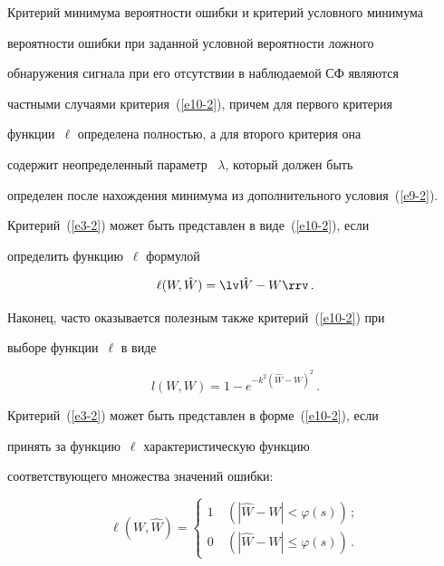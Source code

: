Критерий минимума вероятности ошибки и критерий условного минимума


вероятности ошибки при заданной условной вероятности ложного


обнаружения сигнала при его отсутствии в наблюдаемой СФ являются


частными случаями критерия~(\ref{e10-2}), причем для первого критерия


функции~$\ell$ определена полностью, а для второго критерия она


содержит неопределенный параметр~ $\lambda$, который должен быть


определен после нахождения минимума из дополнительного условия~(\ref{e9-2}).





Критерий~(\ref{e3-2}) может быть представлен в виде~(\ref{e10-2}), если


 определить функцию~$\ell$ формулой


\begin{equation*}


\ell (W, \hat W) = \lv \hat W -W\rrv\,.




\end{equation*}


Наконец, часто оказывается полезным также критерий~(\ref{e10-2}) при


выборе функции~$\ell$ в виде


\begin{equation*}


l(W,W) = 1-e^{-k^2(\hat W-W)^2}\,. 




\end{equation*}








Критерий~(\ref{e3-2}) может быть представлен в форме~(\ref{e10-2}), если


 принять за функцию~$\ell$ характеристическую функцию


 соответствующего множества значений ошибки:


    \begin{equation*}


    \ell (W,\hat W) =\begin{cases}


    1\ &\left(\left\vert \hat W - W\right\vert < \varphi (s)\right)\,; \\[6pt]


    0\ &\left(\left\vert \hat W - W\right\vert \le  \varphi (s)\right)\,.


    \end{cases}




    \end{equation*}








